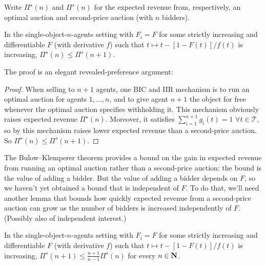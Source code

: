 \documentclass[11pt,letterpaper,reqno,oneside]{article}
\begin{document}
Write $\Pi^\star(n)$ and $\Pi^s(n)$ for the expected revenue from, respectively, an optimal auction and second-price auction (with $n$ bidders).
%
\begin{theorem}
	In the single-object-$n$-agents setting with $F_i=F$ for some strictly increasing and differentiable $F$ (with derivative $f$) such that $t \mapsto t - [1-F(t)] / f(t)$ is increasing, $\Pi^\star(n) \leq \Pi^s(n+1)$.
\end{theorem}

\noindent The proof is an elegant revealed-preference argument:

\begin{proof}
	When selling to $n+1$ agents, one BIC and IIR mechanism is to run an optimal auction for agents $1,\dots,n$, and to give agent $n+1$ the object for free whenever the optimal auction specifies withholding it. This mechanism obviously raises expected revenue $\Pi^\star(n)$. Moreover, it satisfies $\sum_{i=1}^{n+1} g_i(t) = 1$ $\forall t \in \mathcal{T}$, so by  this mechanism raises lower expected revenue than a second-price auction. So $\Pi^\star(n) \leq \Pi^s(n+1)$.
\end{proof}


The Bulow--Klemperer theorem provides a bound on the gain in expected revenue from running an optimal auction rather than a second-price auction: the bound is the value of adding a bidder. But the value of adding a bidder depends on $F$, so we haven't yet obtained a bound that is independent of $F$. To do that, we'll need another lemma that bounds how quickly expected revenue from a second-price auction can grow as the number of bidders is increased independently of $F$. (Possibly also of independent interest.)
%
\begin{lemma}
	\label{lemma:2nd_price_avg_revenue}
	In the single-object-$n$-agents setting with $F_i=F$ for some strictly increasing and differentiable $F$ (with derivative $f$) such that $t \mapsto t - [1-F(t)] / f(t)$ is increasing, $\Pi^s(n+1) \leq \frac{n+1}{n-1} \Pi^s(n)$ for every $n \in \mathbf{N}$.
\end{lemma}
\end{document}
